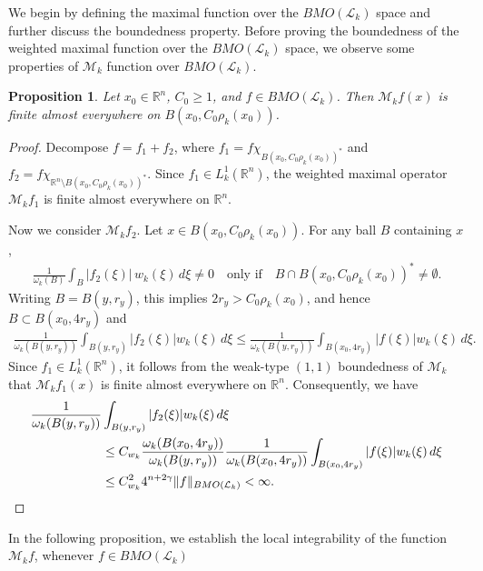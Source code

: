 \documentclass[11pt, reqno]{amsproc}
\newtheorem{proposition}[theorem]{Proposition}
\theoremstyle{definition}
\theoremstyle{remark}
\numberwithin{equation}{section}
\begin{document}
We begin by defining the maximal function over the $BMO(\mathcal{L}_k)$ space and further discuss the boundedness property.   Before proving the boundedness of the weighted maximal function over the $BMO(\mathcal{L}_k)$ space, we observe some properties of $\mathcal{M}_k$ function over $BMO(\mathcal{L}_k)$.

\begin{proposition}
Let $x_0\in \mathbb{R}^n$, $C_0 \geq 1$, and $f\in BMO(\mathcal{L}_k)$. Then $\mathcal{M}_k f(x)$ is finite almost everywhere on $B(x_0, C_0{\rho_k}(x_0))$.
\end{proposition}

\begin{proof}
Decompose $f = f_1 + f_2$, where $f_1 = f \chi_{B(x_0, C_0 {\rho_k}(x_0))^*}$ and $f_2 = f \chi_{\mathbb{R}^n \setminus B(x_0, C_0 {\rho_k}(x_0))^*}$. Since $f_1 \in L_k^1(\mathbb{R}^n)$, the weighted maximal operator $\mathcal{M}_k f_1$ is finite almost everywhere on $\mathbb{R}^n$.

\noindent Now we consider $\mathcal{M}_k f_2$. Let $x \in B(x_0, C_0 {\rho_k}(x_0))$. For any ball $B $ containing $x$,
\begin{align*}
    \frac{1}{\omega_k(B)} \int_B |f_2(\xi)|\, w_k(\xi)\, d\xi \neq 0
\quad \text{only if} \quad
B \cap B(x_0, C_0 {\rho_k}(x_0))^{*} \neq \emptyset.
\end{align*}
Writing $B = B(y,r_y)$, this implies $2r_y > C_0 {\rho_k}(x_0)$, and hence $B \subset B(x_0, 4 r_y)$ and 
\begin{align*}
    \frac{1}{\omega_k(B(y, r_y))} \int_{B(y, r_y)} |f_2(\xi)| w_k(\xi) \, d\xi \leq \frac{1}{\omega_k(B(y, r_y))} \int_{B(x_0, 4 r_y)} |f(\xi)| w_k(\xi) \, d\xi.
\end{align*}
Since $f_1 \in L_k^1(\mathbb{R}^n)$, it follows from the weak-type $(1,1)$ boundedness of $\mathcal{M}_k$ that $\mathcal{M}_k f_1(x)$ is finite almost everywhere on $\mathbb{R}^n$. Consequently, we have
\begin{align}
    \frac{1}{\omega_k(B(y, r_y))} & \int_{B(y, r_y)} |f_2(\xi)| w_k(\xi) \, d\xi \notag \\
    & \leq C_{w_k} \frac{\omega_k(B(x_0, 4 r_y))}{\omega_k(B(y, r_y))}  \frac{1}{\omega_k(B(x_0, 4 r_y))} \int_{B(x_0, 4 r_y)} |f(\xi)| w_k(\xi) \, d\xi \notag\\
    &\leq C_{w_k}^2 4^{n + 2 \gamma} \|f\|_{BMO(\mathcal{L}_k)} < \infty. \label{Eq_5.1}
\end{align}
\end{proof}
In the following proposition, we establish the local integrability of the function $\mathcal{M}_kf$, whenever $f\in BMO(\mathcal{L}_k)$
\end{document}
